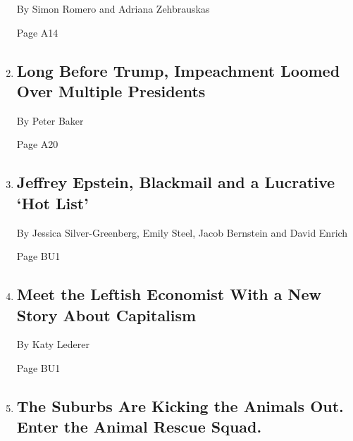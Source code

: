 \begin{enumerate}
  By Simon Romero and Adriana Zehbrauskas

  Page A14
\item
  \href{/2019/11/30/us/politics/impeachment-presidents.html}{}

  \hypertarget{long-before-trump-impeachment-loomed-over-multiple-presidents}{%
  \subsection{Long Before Trump, Impeachment Loomed Over Multiple
  Presidents}\label{long-before-trump-impeachment-loomed-over-multiple-presidents}}

  By Peter Baker

  Page A20
\item
  \href{/2019/11/30/business/david-boies-pottinger-jeffrey-epstein-videos.html}{}

  \hypertarget{jeffrey-epstein-blackmail-and-a-lucrative-hot-list}{%
  \subsection{Jeffrey Epstein, Blackmail and a Lucrative `Hot
  List'}\label{jeffrey-epstein-blackmail-and-a-lucrative-hot-list}}

  By Jessica Silver-Greenberg, Emily Steel, Jacob Bernstein and David
  Enrich

  Page BU1
\item
  \href{/2019/11/26/business/mariana-mazzucato.html}{}

  \hypertarget{meet-the-leftish-economist-with-a-new-story-about-capitalism}{%
  \subsection{Meet the Leftish Economist With a New Story About
  Capitalism}\label{meet-the-leftish-economist-with-a-new-story-about-capitalism}}

  By Katy Lederer

  Page BU1
\item
  \href{/2019/11/30/style/suburbs-animals.html}{}

  \hypertarget{the-suburbs-are-kicking-the-animals-out-enter-the-animal-rescue-squad}{%
  \subsection{The Suburbs Are Kicking the Animals Out. Enter the Animal
  Rescue
  Squad.}\label{the-suburbs-are-kicking-the-animals-out-enter-the-animal-rescue-squad}}


\end{enumerate}
